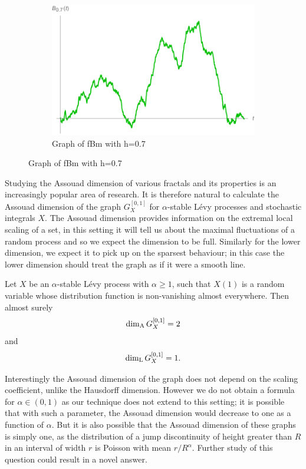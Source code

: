 \begin{figure}[h]
\begin{subfigure}[b]{0.3\textwidth}
		\includegraphics[width=\textwidth]{pics/ch-brownian/fbm0_7.pdf}
		\caption{Graph of fBm with h=0.7}
		\label{fig:fbm7}
	\end{subfigure}
\end{figure}


Studying the Assouad dimension of various fractals and its properties is an increasingly popular area of research. It is therefore natural to calculate the Assouad dimension of the graph $G_X^{[0,1]}$ for $\alpha$-stable L\'{e}vy processes and stochastic integrals $X$. The Assouad dimension provides information on the extremal local scaling of a set, in this setting it will tell us about the maximal fluctuations of a random process and so we expect the dimension to be full. Similarly for the lower dimension, we expect it to pick up on the sparsest behaviour; in this case the lower dimension should treat the graph as if it were a smooth line.


\begin{theorem}\label{Main}
	Let $X$ be an $\alpha$-stable L\'evy process with $\alpha \geq 1$, such that $X(1)$ is a random variable whose distribution function is non-vanishing almost everywhere. Then almost surely
	\[
	\dim_{\textup{A}} G_{X}^{[0,1]} = 2
	\]
	and 
	\[ 
	\dim_{\textup{L}} G_{X}^{[0,1]} = 1.
	\]
\end{theorem}

Interestingly the Assouad dimension of the graph does not depend on the scaling coefficient, unlike the Hausdorff dimension. However we do not obtain a formula for $\alpha \in (0,1)$ as our technique does not extend to this setting; it is possible that with such a parameter, the Assouad dimension would decrease to one as a function of $\alpha$. But it is also possible that the Assouad dimension of these graphs is simply one, as the distribution of a jump discontinuity of height greater than $R$ in an interval of width $r$ is Poisson with mean $r/R^\alpha$. Further study of this question could result in a novel answer.


